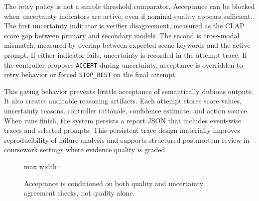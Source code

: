 \documentclass[12pt]{article}
\begin{document}
The retry policy is not a simple threshold comparator. Acceptance can be blocked when uncertainty indicators are active, even if nominal quality appears sufficient. The first uncertainty indicator is verifier disagreement, measured as the CLAP score gap between primary and secondary models. The second is cross-modal mismatch, measured by overlap between expected scene keywords and the active prompt. If either indicator fails, uncertainty is recorded in the attempt trace. If the controller proposes \texttt{ACCEPT} during uncertainty, acceptance is overridden to retry behavior or forced \texttt{STOP\_BEST} on the final attempt.

This gating behavior prevents brittle acceptance of semantically dubious outputs. It also creates auditable reasoning artifacts. Each attempt stores score values, uncertainty reasons, controller rationale, confidence estimate, and action source. When runs finish, the system persists a report JSON that includes event-wise traces and selected prompts. This persistent trace design materially improves reproducibility of failure analysis and supports structured postmortem review in coursework settings where evidence quality is graded.

\begin{figure}[H]
\centering
\begin{adjustbox}{max width=\textwidth}
\end{adjustbox}
\caption{Acceptance is conditioned on both quality and uncertainty agreement checks, not quality alone.}
\label{fig:uncertainty-gate}
\end{figure}
\end{document}
